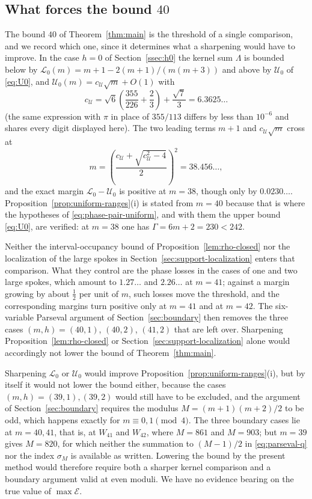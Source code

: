 \documentclass[11pt]{article}
\theoremstyle{definition}
\theoremstyle{remark}
\numberwithin{equation}{section}
\newcommand{\calE}{\mathcal{E}}
\begin{document}
\subsection*{What forces the bound \texorpdfstring{$40$}{40}}

The bound $40$ of Theorem~\ref{thm:main} is the threshold of a single
comparison, and we record which one, since it determines what a sharpening
would have to improve. In the case $h=0$ of Section~\ref{ssec:h0} the kernel sum $\Lambda$ is
bounded below by $\mathcal L_0(m)=m+1-2(m+1)/(m(m+3))$ and above by
$\mathcal U_0$ of \eqref{eq:U0}, and $\mathcal U_0(m)=c_{\mathcal U}\sqrt m+O(1)$ with
\[
  c_{\mathcal U}=\sqrt6\left(\frac{355}{226}+\frac23\right)+\frac{\sqrt7}3=6.3625\ldots
\]
(the same expression with $\pi$ in place of $355/113$ differs by less than
$10^{-6}$ and shares every digit displayed here). The two leading terms $m+1$
and $c_{\mathcal U}\sqrt m$ cross at
\[
  m=\left(\frac{c_{\mathcal U}+\sqrt{c_{\mathcal U}^2-4}}2\right)^{\!2}=38.456\ldots,
\]
and the exact margin $\mathcal L_0-\mathcal U_0$ is positive at $m=38$, though
only by $0.0230\ldots$. Proposition~\ref{prop:uniform-ranges}(i) is stated from
$m=40$ because that is where the hypotheses of
\eqref{eq:phase-pair-uniform}, and with them the upper bound \eqref{eq:U0}, are
verified: at $m=38$ one has $\Gamma=6m+2=230<242$.

Neither the interval-occupancy bound of Proposition~\ref{lem:rho-closed} nor the
localization of the large spokes in Section~\ref{sec:support-localization}
enters that comparison. What they control are the phase losses in the
cases of one and two large spokes, which amount to $1.27\ldots$ and
$2.26\ldots$ at $m=41$; against a margin growing by about $\tfrac12$ per unit of
$m$, such losses move the threshold, and the corresponding margins turn positive
only at $m=41$ and at $m=42$. The six-variable Parseval argument of
Section~\ref{sec:boundary} then removes the three cases $(m,h)=(40,1)$,
$(40,2)$, $(41,2)$ that are left over. Sharpening Proposition~\ref{lem:rho-closed} or
Section~\ref{sec:support-localization} alone would accordingly not lower the
bound of Theorem~\ref{thm:main}.

Sharpening $\mathcal L_0$ or $\mathcal U_0$ would improve
Proposition~\ref{prop:uniform-ranges}(i), but by itself it would not lower the
bound either, because the cases $(m,h)=(39,1),(39,2)$ would still have to be
excluded, and the argument of Section~\ref{sec:boundary} requires the modulus $M=(m+1)(m+2)/2$ to be odd, which happens exactly
for $m\equiv0,1\pmod4$. The three boundary cases lie at $m=40,41$, that is, at
$W_{41}$ and $W_{42}$, where $M=861$ and $M=903$; but $m=39$ gives $M=820$, for
which neither the summation to $(M-1)/2$ in \eqref{eq:parseval-q} nor the index
$\sigma_M$ is available as written. Lowering the bound by the present method
would therefore require both a sharper kernel comparison and a boundary argument
valid at even moduli. We have no evidence bearing on the true value of
$\max\calE$.
\end{document}
